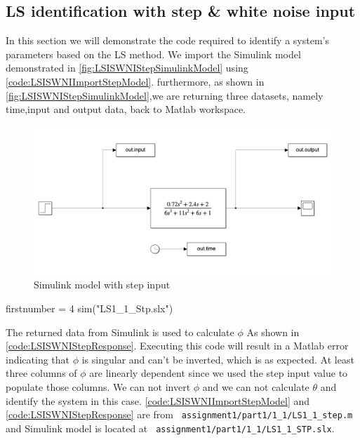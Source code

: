 \FloatBarrier
\subsection{LS identification with step \& white noise input}
In this section we will demonstrate the code required to identify a system's parameters based on the LS method. We import the Simulink model demonstrated in \autoref{fig:LSISWNIStepSimulinkModel} using \autoref{code:LSISWNIImportStepModel}.
furthermore, as shown in \autoref{fig:LSISWNIStepSimulinkModel},we are returning three datasets, namely time,input and output data, back to Matlab workspace.

\begin{figure}
	\centering
	\includegraphics[width=\textwidth]{images/LSISWNIStepSimulinkModel.png}
	\caption{Simulink model with step input}
	\label{fig:LSISWNIStepSimulinkModel}
\end{figure}


\begin{code}
	\begin{matlabcode}{firstnumber = 4}
		sim("LS1_1_Stp.slx")
	\end{matlabcode}
	\label{code:LSISWNIImportStepModel}
\end{code}

The returned data from Simulink is used to calculate $\phi$ As shown in \autoref{code:LSISWNIStepResponse}. Executing this code will result in a Matlab error indicating that $\phi$ is singular and can't be inverted, which is as expected. At least three columns of $\phi$ are linearly dependent since we used the step input value to populate those columns. We can not invert $\phi$ and we can not calculate $\theta$ and identify the system in this case. \autoref{code:LSISWNIImportStepModel} and \autoref{code:LSISWNIStepResponse} are from \hspace{-1ex}\lstinline| assignment1/part1/1_1/LS1_1_step.m| and Simulink model is located at \hspace{-1ex}\lstinline| assignment1/part1/1_1/LS1_1_STP.slx|.

